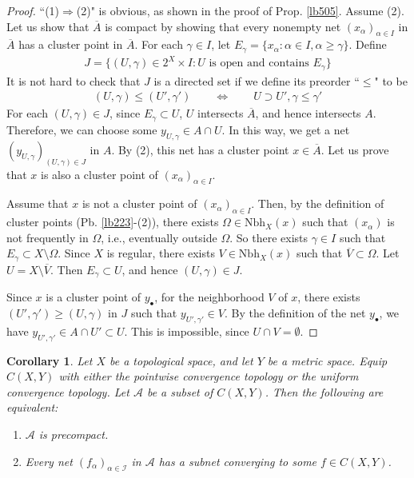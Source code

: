 \documentclass[12pt,b5paper,notitlepage]{article}
\theoremstyle{definition}
\theoremstyle{plain}
\newtheorem{co}[df]{Corollary}
\newcommand{\ovl}{\overline}
\newcommand{\scr}{\mathscr}
\newcommand{\blt}{\bullet}
\newcommand{\Nbh}{\mathrm{Nbh}}
\numberwithin{equation}{section}
\begin{document}
\begin{proof}%
``(1)$\Rightarrow$(2)" is obvious, as shown in the proof of Prop. \ref{lb505}. Assume (2). Let us show that $\ovl A$ is compact by showing that every nonempty net $(x_\alpha)_{\alpha\in I}$ in $\ovl A$ has a cluster point in $\ovl A$. 
For each $\gamma\in I$, let $E_\gamma=\{x_\alpha:\alpha\in I,\alpha\geq\gamma\}$. Define 
\begin{align*}
J=\big\{(U,\gamma)\in 2^X\times I:U\text{ is open and contains } E_\gamma \big\}
\end{align*}
It is not hard to check that $J$ is a directed set if we define its preorder ``$\leq$" to be
\begin{align*}
(U,\gamma)\leq(U',\gamma')\qquad\Longleftrightarrow\qquad U\supset U',\gamma\leq \gamma'
\end{align*}
For each $(U,\gamma)\in J$, since $E_\gamma\subset U$, $U$ intersects $\ovl A$, and hence intersects $A$. Therefore, we can choose some $y_{U,\gamma}\in A\cap U$. In this way, we get a net $(y_{U,\gamma})_{(U,\gamma)\in J}$ in $A$. By (2), this net has a cluster point $x\in\ovl A$. Let us prove that $x$ is also a cluster point of $(x_\alpha)_{\alpha\in I}$.


Assume that $x$ is not a cluster point of $(x_\alpha)_{\alpha\in I}$. Then, by the definition of cluster points (Pb. \ref{lb223}-(2)), there exists $\Omega\in\Nbh_X(x)$ such that $(x_\alpha)$ is not frequently in $\Omega$, i.e., eventually outside $\Omega$. So there exists $\gamma\in I$ such that $E_\gamma\subset X\setminus \Omega$. Since $X$ is regular, there exists $V\in\Nbh_X(x)$ such that $\ovl V\subset \Omega$. Let $U=X\setminus \ovl V$. Then $E_\gamma\subset U$, and hence $(U,\gamma)\in J$.

Since $x$ is a cluster point of $y_\blt$, for the neighborhood $V$ of $x$, there exists $(U',\gamma')\geq (U,\gamma)$ in $J$ such that $y_{U',\gamma'}\in V$. By the definition of the net $y_\blt$, we have $y_{U',\gamma'}\in A\cap U'\subset U$. This is impossible, since $U\cap V=\emptyset$.
\end{proof}


\begin{co}\label{lb508}
Let $X$ be a topological space, and let $Y$ be a metric space. Equip $C(X,Y)$ with either the pointwise convergence topology or the uniform convergence topology. Let $\scr A$ be a subset of $C(X,Y)$. Then the following are equivalent:
\begin{enumerate}[label=(\arabic*)]
\item $\scr A$ is precompact.
\item Every net $(f_\alpha)_{\alpha\in\scr I}$  in $\scr A$ has a subnet converging to some $f\in C(X,Y)$.
\end{enumerate}
\end{co}
\end{document}
